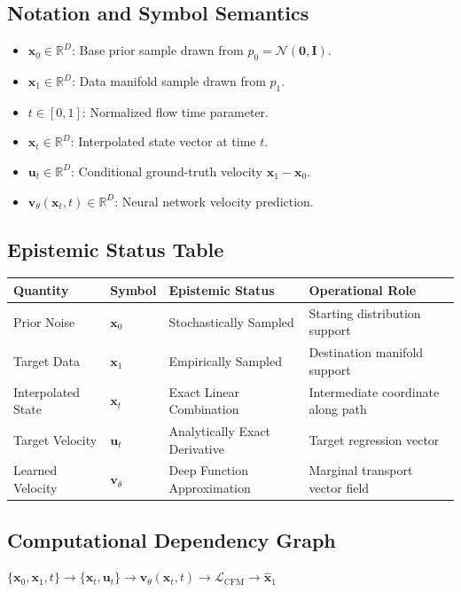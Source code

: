 \documentclass[11pt,a4paper]{article}
\theoremstyle{definition}
\begin{document}
\subsection{Notation and Symbol Semantics}
\begin{itemize}
    \item $\mathbf{x}_0 \in \mathbb{R}^D$: Base prior sample drawn from $p_0 = \mathcal{N}(\mathbf{0}, \mathbf{I})$.
    \item $\mathbf{x}_1 \in \mathbb{R}^D$: Data manifold sample drawn from $p_1$.
    \item $t \in [0, 1]$: Normalized flow time parameter.
    \item $\mathbf{x}_t \in \mathbb{R}^D$: Interpolated state vector at time $t$.
    \item $\mathbf{u}_t \in \mathbb{R}^D$: Conditional ground-truth velocity $\mathbf{x}_1 - \mathbf{x}_0$.
    \item $\mathbf{v}_\theta(\mathbf{x}_t, t) \in \mathbb{R}^D$: Neural network velocity prediction.
\end{itemize}

\subsection{Epistemic Status Table}
\begin{table}[h]
\centering
\small
\begin{tabular}{@{}llll@{}}
\toprule
\textbf{Quantity} & \textbf{Symbol} & \textbf{Epistemic Status} & \textbf{Operational Role} \\
\midrule
Prior Noise & $\mathbf{x}_0$ & Stochastically Sampled & Starting distribution support \\
Target Data & $\mathbf{x}_1$ & Empirically Sampled & Destination manifold support \\
Interpolated State & $\mathbf{x}_t$ & Exact Linear Combination & Intermediate coordinate along path \\
Target Velocity & $\mathbf{u}_t$ & Analytically Exact Derivative & Target regression vector \\
Learned Velocity & $\mathbf{v}_\theta$ & Deep Function Approximation & Marginal transport vector field \\
\bottomrule
\end{tabular}
\end{table}

\subsection{Computational Dependency Graph}
{\centering
$\{\mathbf{x}_0, \mathbf{x}_1, t\} \longrightarrow \{\mathbf{x}_t, \mathbf{u}_t\} \longrightarrow \mathbf{v}_\theta(\mathbf{x}_t, t) \longrightarrow \mathcal{L}_{\text{CFM}} \longrightarrow \hat{\mathbf{x}}_1$
\par}
\end{document}
